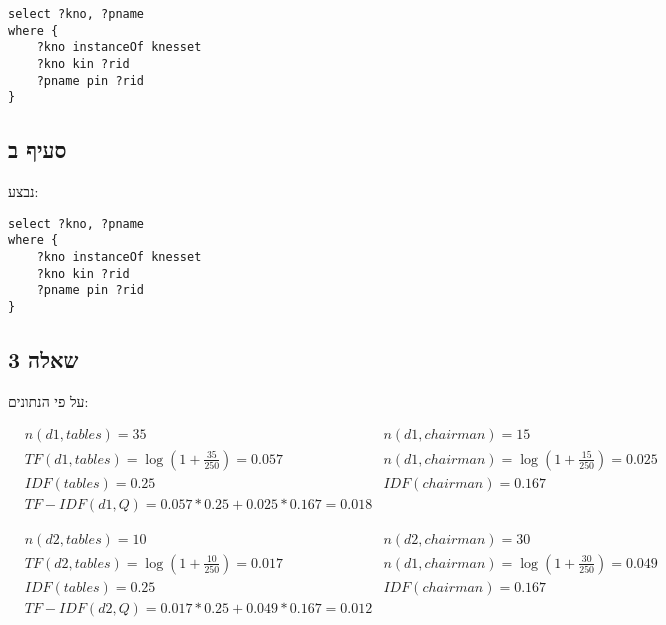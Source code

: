 \documentclass{article}
\begin{document}
\begin{lstlisting}[language=SPARQL]
select ?kno, ?pname
where {
    ?kno instanceOf knesset
    ?kno kin ?rid
    ?pname pin ?rid
}
\end{lstlisting}

\begin{hebrew}
    \subsection*{סעיף ב}
    נבצע:
\end{hebrew}

\begin{lstlisting}[language=SPARQL]
select ?kno, ?pname
where {
    ?kno instanceOf knesset
    ?kno kin ?rid
    ?pname pin ?rid
}
\end{lstlisting}

\pagebreak

\begin{hebrew}

    \section*{שאלה 3}

    על פי הנתונים:

\end{hebrew}

\begin{align*}
     & n(d1,tables) =35                                   & n(d1,chairman)=15                            \\
     & TF(d1,tables) =\log(1+\frac{35}{250})=0.057        & n(d1, chairman)=\log(1+\frac{15}{250})=0.025 \\
     & IDF(tables)=0.25                                   & IDF(chairman)=0.167                          \\
     & TF-IDF(d1, Q)=0.057 * 0.25 + 0.025 * 0.167 = 0.018
\end{align*}

\begin{align*}
     & n(d2,tables) =10                                                     & n(d2,chairman)=30                            \\
     & TF(d2,tables) =\log(1+\frac{10}{250})=0.017                          & n(d1, chairman)=\log(1+\frac{30}{250})=0.049 \\
     & IDF(tables)=0.25                                                     & IDF(chairman)=0.167                          \\
     & TF-IDF(d2, Q)=0.017 * 0.25                   + 0.049 * 0.167 = 0.012
\end{align*}
\end{document}
